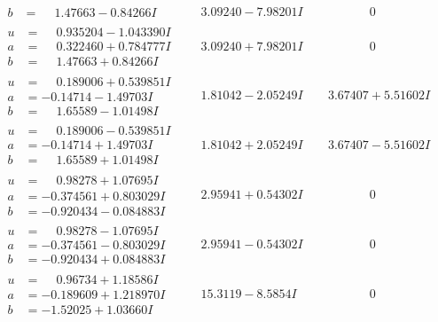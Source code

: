 \documentclass[1p]{elsarticle_modified}
\theoremstyle{definition}
\begin{document}
$$\begin{array}{c|c|c}
\begin{aligned}
b &= \phantom{-}1.47663 - 0.84266 I\end{aligned}
 & \phantom{-}3.09240 - 7.98201 I & \phantom{-0.000000 } 0 \\ \hline\begin{aligned}
u &= \phantom{-}0.935204 - 1.043390 I \\
a &= \phantom{-}0.322460 + 0.784777 I \\
b &= \phantom{-}1.47663 + 0.84266 I\end{aligned}
 & \phantom{-}3.09240 + 7.98201 I & \phantom{-0.000000 } 0 \\ \hline\begin{aligned}
u &= \phantom{-}0.189006 + 0.539851 I \\
a &= -0.14714 - 1.49703 I \\
b &= \phantom{-}1.65589 - 1.01498 I\end{aligned}
 & \phantom{-}1.81042 - 2.05249 I & \phantom{-}3.67407 + 5.51602 I \\ \hline\begin{aligned}
u &= \phantom{-}0.189006 - 0.539851 I \\
a &= -0.14714 + 1.49703 I \\
b &= \phantom{-}1.65589 + 1.01498 I\end{aligned}
 & \phantom{-}1.81042 + 2.05249 I & \phantom{-}3.67407 - 5.51602 I \\ \hline\begin{aligned}
u &= \phantom{-}0.98278 + 1.07695 I \\
a &= -0.374561 + 0.803029 I \\
b &= -0.920434 - 0.084883 I\end{aligned}
 & \phantom{-}2.95941 + 0.54302 I & \phantom{-0.000000 } 0 \\ \hline\begin{aligned}
u &= \phantom{-}0.98278 - 1.07695 I \\
a &= -0.374561 - 0.803029 I \\
b &= -0.920434 + 0.084883 I\end{aligned}
 & \phantom{-}2.95941 - 0.54302 I & \phantom{-0.000000 } 0 \\ \hline\begin{aligned}
u &= \phantom{-}0.96734 + 1.18586 I \\
a &= -0.189609 + 1.218970 I \\
b &= -1.52025 + 1.03660 I\end{aligned}
 & \phantom{-}15.3119 - 8.5854 I & \phantom{-0.000000 } 0 \\ \hline\begin{aligned}

\end{aligned}
\end{array}$$
\end{document}

